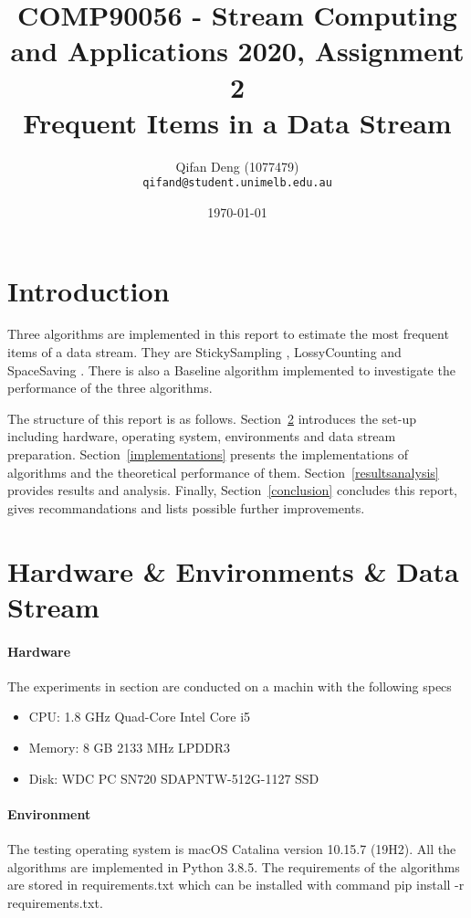\documentclass[10pt]{article}
\title{COMP90056 - Stream Computing and Applications 2020, Assignment 2 
\\Frequent Items in a Data Stream}
\author{
  Qifan Deng (1077479)\\
  \texttt{qifand@student.unimelb.edu.au} }
\date{\printdayoff\normalsize\today}
\begin{document}
\sloppy
\maketitle

\section{Introduction}
Three algorithms are implemented in this report to estimate the most frequent items of a data stream.
They are StickySampling \cite{stickylossy}, LossyCounting \cite{stickylossy} and SpaceSaving \cite{spacesaving}. 
There is also a Baseline algorithm implemented to investigate the performance of the three algorithms.

The structure of this report is as follows. 
Section~\ref{preparation} introduces the set-up including hardware, operating system, environments 
and data stream preparation.
Section~\ref{implementations} presents the implementations of algorithms 
and the theoretical performance of them.
Section~\ref{resultsanalysis} provides results and analysis. 
Finally, Section~\ref{conclusion} concludes this report,
gives recommandations and lists possible further improvements. 

\section{Hardware \& Environments \& Data Stream}\label{preparation}

\paragraph{Hardware}
The experiments in section are conducted on a machin with the following specs
\begin{itemize}
     \setlength\itemsep{1pt}
       \item CPU: 1.8 GHz Quad-Core Intel Core i5
       \item Memory: 8 GB 2133 MHz LPDDR3
       \item Disk: WDC PC SN720 SDAPNTW-512G-1127 SSD
\end{itemize}
\paragraph{Environment}
The testing operating system is macOS Catalina version 10.15.7 (19H2).
All the algorithms are implemented in Python 3.8.5.
The requirements of the algorithms are stored in requirements.txt which can be installed with command pip install -r requirements.txt.
\end{document}
